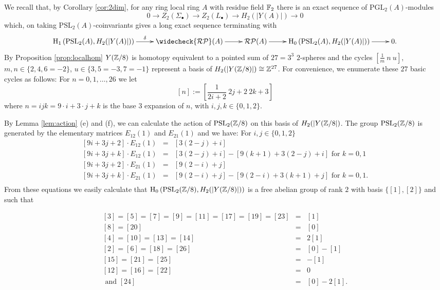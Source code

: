 \documentclass[12pt]{amsart}
\theoremstyle{definition}
\newcommand{\F}[1]{\Bbb{F}_{#1}}
\newcommand{\Z}{\Bbb{Z}}
\newcommand{\scyc}[1]{\left[ #1 \right]} %
\newcommand{\octt}[1]{\left[ #1\right]}%
\newcommand{\pspl}[2]{\mathrm{PSL}_{#1}(#2)}
\newcommand{\pgl}[2]{\mathrm{PGL}_{#1}(#2)}
\newcommand{\rpb}[1]{\mathcal{RP}(#1)}%
\newcommand{\crpb}[1]{\widecheck{\mathcal{RP}}(#1)}
\newcommand{\<}{\langle}
\renewcommand{\>}{\rangle}
\newcommand{\ho}[3]{\mathrm{H}_{#1}\left( #2,#3 \right)}
\begin{document}
We recall that, by Corollary \ref{cor:2dim}, for any ring local ring $A$ with residue field $\F{2}$ there is an exact sequence of $\pgl{2}{A}$-modules 
\[
0\to Z_2(\Sigma_\bullet)\to Z_2(L_\bullet)\to H_2(|Y(A)|)\to 0
\]
which, on taking $\pspl{2}{A}$-coinvariants gives a long exact sequence terminating with
\[
\xymatrix{
\ho{1}{\pspl{2}{A}}{H_2(|Y(A)|)}\ar^-{\delta}[r]&\crpb{A}\ar[r]&\rpb{A}\ar[r]&\ho{0}{\pspl{2}{A}}{H_2(|Y(A)|)}\ar[r]&0.\\
}
\]
By Proposition \ref{prop:localhom} $Y(\Z/8)$ is homotopy equivalent to a pointed sum of $27=3^3$ $2$-spheres and the cycles $\scyc{\frac{1}{m}\ n\ u}$, $m,n\in \{2,4,6=-2\}$, $u\in \{ 3, 5=-3,7=-1\}$ 
represent a basis of $H_2(|Y(\Z/8)|)\cong \Z^{27}$. For convenience, we enumerate these $27$ basic cycles as follows: For $n=0,1,\ldots,26$ we let
\[
\octt{n}:=\scyc{\frac{1}{2i+2}\ 2j+2\ 2k+3}
\]
where $n=ijk=9\cdot i+3\cdot j+k$ is the base $3$ expansion of $n$, with $i,j,k\in\{ 0,1,2\}$.

By Lemma \ref{lem:action} (e) and (f), we can calculate the action of $\pspl{2}{\Z/8}$ on this basis of $H_2(|Y(\Z/8|)$. The group $\pspl{2}{\Z/8}$ is generated by the elementary matrices $E_{12}(1)$ and $E_{21}(1)$ and we have: For $i,j\in \{ 0,1,2\}$
\begin{eqnarray*}
\octt{9i+3j+2}\cdot E_{12}(1)&=&\octt{3(2-j)+i}\\
\octt{9i+3j+k}\cdot E_{12}(1)&=&\octt{3(2-j)+i}-\octt{9(k+1)+3(2-j)+i}\mbox{ for }k=0,1\\
\octt{9i+3j+2}\cdot E_{21}(1)&=&\octt{9(2-i)+j}\\
\octt{9i+3j+k}\cdot E_{21}(1)&=&\octt{9(2-i)+j}-\octt{9(2-i)+3(k+1)+j}\mbox{ for }k=0,1.\\
\end{eqnarray*}
From these equations we easily calculate that $\ho{0}{\pspl{2}{\Z/8}}{H_2(|Y(\Z/8)|)}$ is a free abelian group of rank $2$ with basis $\{ \octt{1},\octt{2}\}$ and such that 

\begin{eqnarray*}
\octt{3}=\octt{5}=\octt{7}=\octt{9}=\octt{11}=\octt{17}=\octt{19}=\octt{23}&=&\octt{1}\\
\octt{8}=\octt{20}&=&\octt{0}\\
\octt{4}=\octt{10}=\octt{13}=\octt{14}&=&2\octt{1}\\
\octt{2}=\octt{6}=\octt{18}=\octt{26}&=&\octt{0}-\octt{1}\\
\octt{15}=\octt{21}=\octt{25}&=&-\octt{1}\\
 \octt{12}=\octt{16}=\octt{22}&=&0\\
\mbox{ and } \octt{24}&=&\octt{0}-2\octt{1}.\\
\end{eqnarray*}
\end{document}
